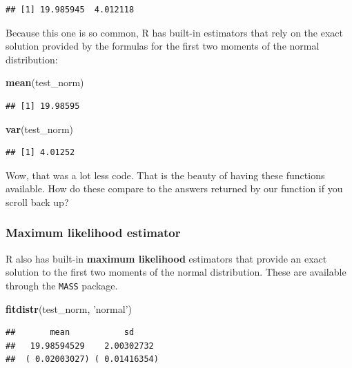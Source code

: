 \documentclass[
]{book}
\newenvironment{Shaded}{\begin{snugshade}}{\end{snugshade}}
\newcommand{\KeywordTok}[1]{\textcolor[rgb]{0.13,0.29,0.53}{\textbf{#1}}}
\newcommand{\NormalTok}[1]{#1}
\newcommand{\StringTok}[1]{\textcolor[rgb]{0.31,0.60,0.02}{#1}}
\begin{document}
\begin{verbatim}
## [1] 19.985945  4.012118
\end{verbatim}

Because this one is so common, R has built-in estimators that rely on
the exact solution provided by the formulas for the first two moments
of the normal distribution:

\begin{Shaded}
\begin{Highlighting}[]
\KeywordTok{mean}\NormalTok{(test_norm)}
\end{Highlighting}
\end{Shaded}

\begin{verbatim}
## [1] 19.98595
\end{verbatim}

\begin{Shaded}
\begin{Highlighting}[]
\KeywordTok{var}\NormalTok{(test_norm)}
\end{Highlighting}
\end{Shaded}

\begin{verbatim}
## [1] 4.01252
\end{verbatim}

Wow, that was a lot less code. That is the beauty of having these functions available. How do these compare to the answers returned by our function if you scroll back up?

\hypertarget{maximum-likelihood-estimator}{%
\subsubsection{Maximum likelihood estimator}\label{maximum-likelihood-estimator}}

R also has built-in \textbf{maximum likelihood} estimators that provide an exact solution to the first two moments of the normal distribution. These are available through the \texttt{MASS} package.

\begin{Shaded}
\begin{Highlighting}[]
\KeywordTok{fitdistr}\NormalTok{(test_norm, }\StringTok{'normal'}\NormalTok{)}
\end{Highlighting}
\end{Shaded}

\begin{verbatim}
##       mean           sd     
##   19.98594529    2.00302732 
##  ( 0.02003027) ( 0.01416354)
\end{verbatim}
\end{document}
